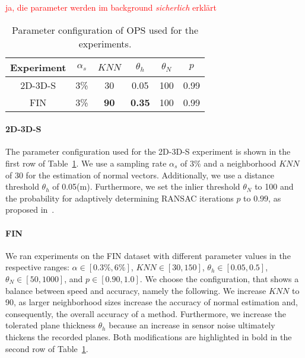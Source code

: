 \documentclass[main.tex]{subfiles}
\begin{document}
\textcolor{red}{ja, die parameter werden im background \textit{sicherlich} erklärt}
\begin{table}[H]
    \centering
    \begin{tabular}{c|ccccc}
        Experiment & $\alpha_s$ & $KNN$       & $\theta_{h}$  & $\theta_{N}$ & $p$  \\ \hline
        2D-3D-S    & 3\%        & 30          & 0.05          & 100          & 0.99 \\
        FIN        & 3\%        & \textbf{90} & \textbf{0.35} & 100          & 0.99
    \end{tabular}%
    \caption{Parameter configuration of OPS used for the experiments.}
    \label{tab:ops-param}
\end{table}

\paragraph{2D-3D-S}
The parameter configuration used for the 2D-3D-S experiment is shown in the first row of Table~\ref{tab:ops-param}.
We use a sampling rate $\alpha_s$ of 3\% and a neighborhood $KNN$ of 30 for the estimation of normal vectors.
Additionally, we use a distance threshold $\theta_h$ of 0.05(m).
Furthermore, we set the inlier threshold $\theta_N$ to 100 and the probability for adaptively determining RANSAC iterations
$p$ to $0.99$, as proposed in~\cite[Section~4A]{Sun_Mordohai_2019}.

\paragraph{FIN}
We ran experiments on the FIN dataset with different parameter values in the respective ranges:
$\alpha\in[0.3\%, 6\%]$, $KNN\in[30, 150]$, $\theta_h\in[0.05, 0.5]$, $\theta_N\in[50, 1000]$, and $p\in[0.90, 1.0]$.
We choose the configuration, that shows a balance between speed and accuracy, namely the following.
We increase $KNN$ to 90, as larger neighborhood sizes increase the accuracy of normal estimation and,
consequently, the overall accuracy of a method.
Furthermore, we increase the tolerated plane thickness $\theta_h$ because an increase in sensor noise ultimately thickens the recorded planes.
Both modifications are highlighted in bold in the second row of Table~\ref{tab:ops-param}.
\end{document}
